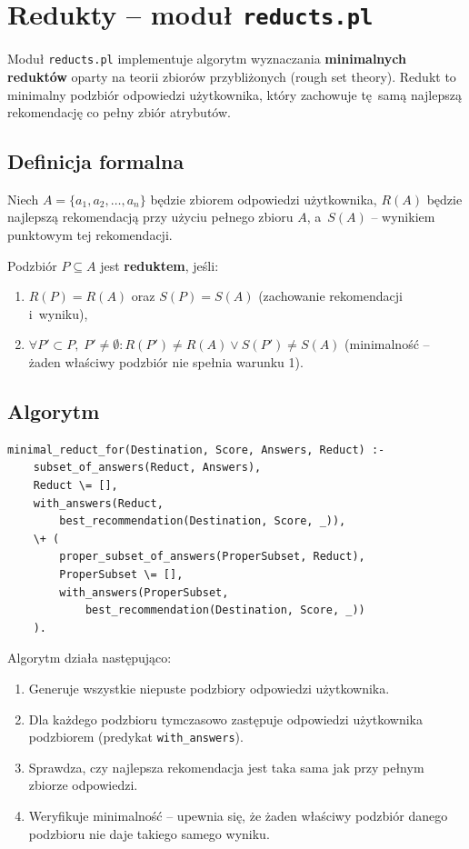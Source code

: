 \documentclass[12pt,a4paper]{article}
\begin{document}
\section{Redukty -- moduł \texttt{reducts.pl}}

Moduł \texttt{reducts.pl} implementuje algorytm wyznaczania \textbf{minimalnych reduktów} oparty na teorii zbiorów przybliżonych (rough set theory). Redukt to minimalny podzbiór odpowiedzi użytkownika, który zachowuje tę~samą najlepszą rekomendację co pełny zbiór atrybutów.

\subsection{Definicja formalna}

Niech $A = \{a_1, a_2, \ldots, a_n\}$ będzie zbiorem odpowiedzi użytkownika, $R(A)$ będzie najlepszą rekomendacją przy użyciu pełnego zbioru $A$, a~$S(A)$ -- wynikiem punktowym tej rekomendacji.

Podzbiór $P \subseteq A$ jest \textbf{reduktem}, jeśli:
\begin{enumerate}
    \item $R(P) = R(A)$ oraz $S(P) = S(A)$ (zachowanie rekomendacji i~wyniku),
    \item $\forall P' \subset P,\; P' \neq \emptyset: R(P') \neq R(A) \lor S(P') \neq S(A)$ (minimalność -- żaden właściwy podzbiór nie spełnia warunku 1).
\end{enumerate}

\subsection{Algorytm}

\begin{lstlisting}[style=prolog, caption={Wyznaczanie minimalnych reduktów}]
minimal_reduct_for(Destination, Score, Answers, Reduct) :-
    subset_of_answers(Reduct, Answers),
    Reduct \= [],
    with_answers(Reduct,
        best_recommendation(Destination, Score, _)),
    \+ (
        proper_subset_of_answers(ProperSubset, Reduct),
        ProperSubset \= [],
        with_answers(ProperSubset,
            best_recommendation(Destination, Score, _))
    ).
\end{lstlisting}

Algorytm działa następująco:
\begin{enumerate}
    \item Generuje wszystkie niepuste podzbiory odpowiedzi użytkownika.
    \item Dla każdego podzbioru tymczasowo zastępuje odpowiedzi użytkownika podzbiorem (predykat \texttt{with\_answers}).
    \item Sprawdza, czy najlepsza rekomendacja jest taka sama jak przy pełnym zbiorze odpowiedzi.
    \item Weryfikuje minimalność -- upewnia się, że żaden właściwy podzbiór danego podzbioru nie daje takiego samego wyniku.
\end{enumerate}
\end{document}
